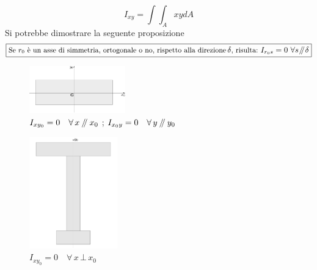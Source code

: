 \begin{equation} \label{equazione3-2}
\boxed{I_{xy}=\int\int_A xydA} \tag{3.2}
\end{equation}
Si potrebbe dimostrare la seguente proposizione
\newcommand{\parallelsum}{\mathbin{\!/\mkern-5mu/\!}}
\begin{equation*}
\boxed{\textup{\small Se $r_0$ è un asse di simmetria, ortogonale o no, rispetto alla direzione}\,\delta\textup{\small, risulta:}\,\,I_{r_{0}s}=0\,\,\forall s\parallelsum\delta}
\end{equation*}
\renewcommand{\thefigure}{3~-~2}
\begin{figure}[ht]
\centering
\includegraphics[width=0.37\textwidth]{Immagini/Parte_3/Figura3_2/Figura3_2.pdf}
\caption{$I_{xy_{0}} = 0 \quad \forall\,x\,\parallelsum\,x_0$   ;   $I_{x_{0}y} = 0 \quad \forall\,y\,\parallelsum\,y_0$}
\label{figura3-2}
\end{figure}
\renewcommand{\thefigure}{3~-~3}
\begin{figure}[h]
\centering
\includegraphics[width=0.34\textwidth]{Immagini/Parte_3/Figura3_3/Figura3_3.pdf}
\caption{$I_{xy_{0}} = 0 \quad \forall\,x\,\bot\,x_0$}
\label{figura3-3}
\end{figure}
